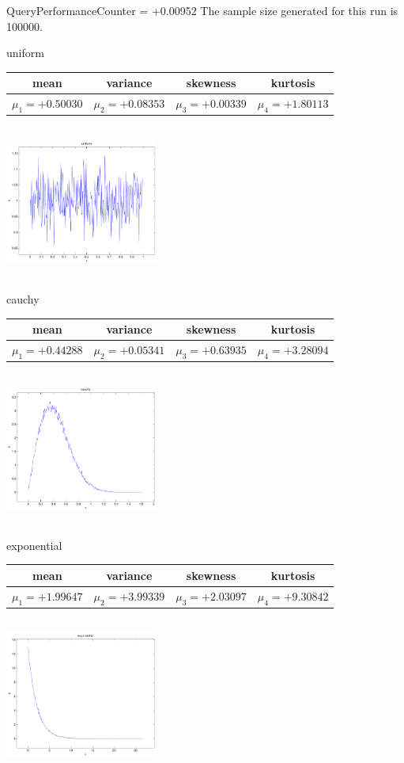 \documentclass[9pt]{article}
\theoremstyle{plain}
\theoremstyle{definition}
\theoremstyle{remark}
\numberwithin{equation}{section}
\begin{document}
QueryPerformanceCounter  =  +0.00952
The sample size generated for this run is 100000.

\newpage
uniform \begin{tabular}{|c|c|c|c|}  mean & variance & skewness & kurtosis \\  \hline
$\mu_1 = +0.50030$ & $\mu_2 = +0.08353$ & $\mu_3 = +0.00339$ & $\mu_4 =+1.80113$ \\
\end{tabular}

\includegraphics[width=5cm,height=5cm]{uniform.pdf}

cauchy \begin{tabular}{|c|c|c|c|}  mean & variance & skewness & kurtosis \\  \hline
$\mu_1 = +0.44288$ & $\mu_2 = +0.05341$ & $\mu_3 = +0.63935$ & $\mu_4 =+3.28094$ \\
\end{tabular}

\includegraphics[width=5cm,height=5cm]{cauchy.pdf}

exponential \begin{tabular}{|c|c|c|c|}  mean & variance & skewness & kurtosis \\  \hline
$\mu_1 = +1.99647$ & $\mu_2 = +3.99339$ & $\mu_3 = +2.03097$ & $\mu_4 =+9.30842$ \\
\end{tabular}

\includegraphics[width=5cm,height=5cm]{exponential.pdf}
\end{document}

